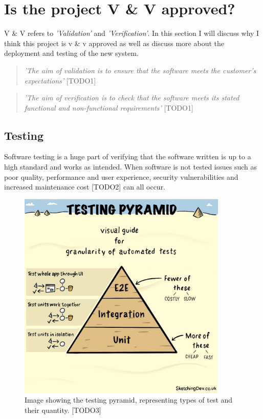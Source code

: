 \section{Is the project V \& V approved?}
  V \& V refers to \textit{'Validation'} and \textit{'Verification'}. In this section I will discuss why I think this project is v \&
  v approved as well as discuss more about the deployment and testing of the new system.

  \begin{quote}
    \textit{'The aim of validation is to ensure that the software meets the customer's expectations'} [TODO1]
  \end{quote}

  \begin{quote}
    \textit{'The aim of verification is to check that the software meets its stated functional and non-functional requirements'} [TODO1]
  \end{quote}

  \subsection{Testing}
  \label{sec:Testing}

  Software testing is a huge part of verifying that the software written is up to a high standard and works as intended. When software is not
  tested issues such as poor quality, performance and user experience, security vulnerabilities and increased maintenance cost [TODO2] can all 
  occur.

  \begin{figure}[H]
    \centering
    \includegraphics[width=10cm]{assets/testingPyramid.jpg}
    \caption{Image showing the testing pyramid, representing types of test and their quantity. [TODO3]}
    \label{fig:testingPyramid}
  \end{figure}

